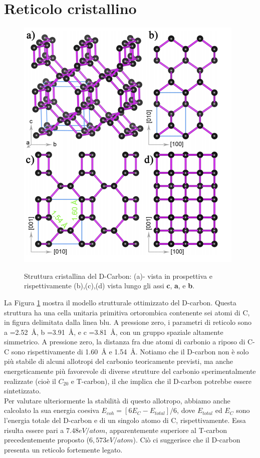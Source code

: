 \documentclass[a4paper,titlepage]{book}
\begin{document}
\section{Reticolo cristallino}
\begin{figure}[h!] 
	\centering \label{DCarbon}
	\includegraphics[width=0.75\columnwidth]{DCarbon.png}
	\caption{ Struttura cristallina del D-Carbon: (a)- vista in prospettiva e rispettivamente (b),(c),(d) vista lungo gli assi \textbf{c}, \textbf{a}, e \textbf{b}.}
\end{figure}
La Figura \ref{DCarbon} mostra il modello strutturale ottimizzato del D-carbon. Questa struttura ha una cella unitaria primitiva ortorombica contenente sei atomi di C, in figura delimitata dalla linea blu. A pressione zero, i parametri di reticolo sono a =\SI{ 2.52}{\angstrom}, b =\SI{3.91}{\angstrom}, e c =\SI{3.81}{\angstrom}, con un gruppo spaziale altamente simmetrico. A pressione zero, la distanza fra due atomi di carbonio a riposo di C-C sono rispettivamente di \SI{1,60}{\angstrom} e \SI{1,54}{\angstrom}. Notiamo che il D-carbon non è solo più stabile di alcuni allotropi del carbonio teoricamente previsti, ma anche energeticamente più favorevole di diverse strutture del carbonio sperimentalmente realizzate (cioè il $C_{20}$ e T-carbon), il che implica che il D-carbon potrebbe essere sintetizzato. \\
Per valutare ulteriormente la stabilità di questo allotropo, abbiamo anche calcolato la sua energia coesiva $E_{coh} = [6E_C - E_ {total}]/6$, dove $E_{total}$ ed $E_C$ sono l'energia totale del D-carbon e di un singolo atomo di C, rispettivamente.
Essa risulta essere pari a $7.48 eV/atom$, apparentemente superiore al T-carbon precedentemente proposto ($6,573 eV / atom$). Ciò ci suggerisce che il D-carbon presenta un reticolo fortemente legato.
\end{document}
